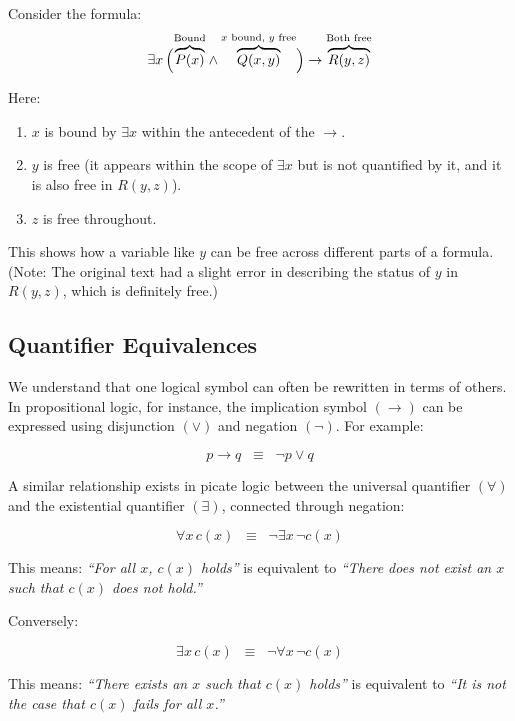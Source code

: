 \documentclass[12pt,a4paper,openany]{article}
\begin{document}
\begin{enumerate}
    Consider the formula:
    \[
    \exists x \,
    \Big(
    {\color{black}\overbrace{\color{black}P(x)}^{\color{black}\text{Bound}}} \wedge
    {\color{black}\overbrace{\color{black}Q(x, y)}^{\color{black}x \text{ bound, } y \text{ free}}}
    \Big) \to
    {\color{black}\overbrace{\color{black}R(y, z)}^{\color{black}\text{Both free}}}
    \]

    Here:
    \begin{enumerate}
        \item $x$ is bound by $\exists x$ within the antecedent of the $\to$.
        \item $y$ is free (it appears within the scope of $\exists x$ but is not quantified by it, and it is also free in $R(y,z)$).
        \item $z$ is free throughout.
    \end{enumerate}
    This shows how a variable like $y$ can be free across different parts of a formula. (Note: The original text had a slight error in describing the status of $y$ in $R(y,z)$, which is definitely free.)
\end{enumerate}

\subsection{Quantifier Equivalences}\label{quantifier-equivalences}

We understand that one logical symbol can often be rewritten in terms of
others. In propositional logic, for instance, the implication symbol
\((\to)\) can be expressed using disjunction \((\lor)\) and
negation \((\lnot)\). For example:

\[
p \to q \;\;\equiv\;\; \lnot p \lor q
\]

A similar relationship exists in picate logic between the universal
quantifier \((\forall)\) and the existential quantifier \((\exists)\),
connected through negation:

\[
\forall x \, c(x) \;\;\equiv\;\; \lnot \exists x \, \lnot c(x)
\]

This means: \emph{``For all \(x\), \(c(x)\) holds''} is equivalent to
\emph{``There does not exist an \(x\) such that \(c(x)\) does not
hold.''}

Conversely:

\[
\exists x \, c(x) \;\;\equiv\;\; \lnot \forall x \, \lnot c(x)
\]

This means: \emph{``There exists an \(x\) such that \(c(x)\) holds''} is
equivalent to \emph{``It is not the case that \(c(x)\) fails for all
\(x\).''}
\end{document}
